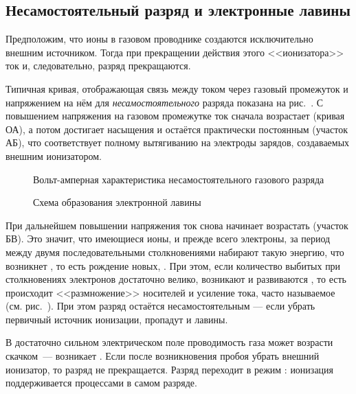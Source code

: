 \subsection*{Несамостоятельный разряд и электронные лавины}
Предположим, что ионы в газовом проводнике создаются исключительно внешним
источником. Тогда при прекращении действия этого <<ионизатора>> ток и,
следовательно, разряд прекращаются.

Типичная кривая, отображающая связь между током через газовый промежуток и
напряжением на нём для \emph{несамостоятельного} разряда показана на
рис.~. С повышением напряжения
на газовом промежутке ток сначала возрастает (кривая ОА), а потом достигает
насыщения и остаётся практически постоянным (участок АБ), что соответствует
полному вытягиванию на электроды зарядов, создаваемых внешним ионизатором.

\begin{figure}[h]
    \centering
    \caption{Вольт-амперная характеристика несамостоятельного газового разряда}
\end{figure}

\begin{figure}[h]
    \centering
    \caption{Схема образования электронной лавины}
\end{figure}

При дальнейшем повышении напряжения ток снова начинает возрастать (участок БВ).
Это значит, что имеющиеся ионы, и прежде всего электроны, за период между двумя
последовательными столкновениями набирают такую энергию, что возникнет
, то есть рождение новых,
. При этом,
если количество выбитых при столкновениях электронов достаточно велико,
возникают и развиваются ,
то есть происходит <<размножение>> носителей и усиление тока,
часто называемое  (см. рис.~).
При этом разряд остаётся несамостоятельным --- если убрать первичный источник
ионизации, пропадут и лавины.



В достаточно сильном электрическом поле проводимость газа может возрасти
скачком~--- возникает .
Если после возникновения пробоя убрать внешний ионизатор, то разряд не
прекращается. Разряд переходит в режим :
ионизация поддерживается процессами в самом разряде.

